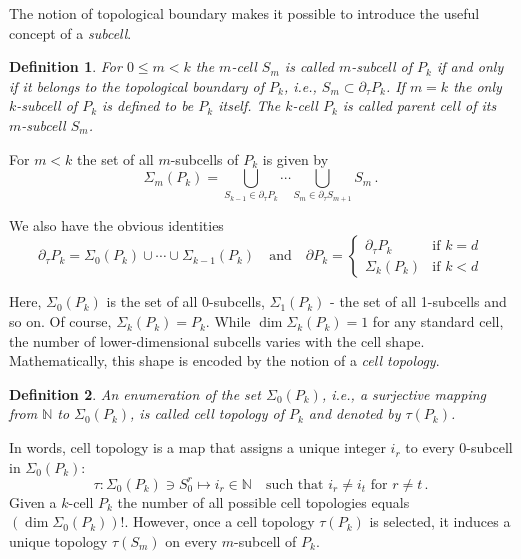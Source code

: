 \documentclass[pdf,12pt,relaxed]{SANDreport}
\newtheorem{defin}{Definition}
\begin{document}
    The notion of topological boundary makes it possible to introduce the useful concept of a \emph{subcell}.
         
    \begin{defin}\label{def:subcell}
    For $0 \le m < k$ the $m$-cell $S_m$ is called $m$-subcell of $P_k$ if and only if it belongs to the topological boundary of $P_k$, i.e., $S_m\subset\partial_\tau{P_k}$. If $m=k$ the only $k$-subcell of $P_k$ is defined to be $P_k$ itself. The $k$-cell $P_k$ is called parent cell of its $m$-subcell $S_m$. 
    \end{defin}
    
    For $m<k$ the set of all $m$-subcells of $P_k$ is given by
    \begin{equation}\label{eq:m-subs}
    \Sigma_m(P_k) = \bigcup_{S_{k-1}\in\partial_\tau P_k} \cdots \bigcup_{S_{m}\in\partial_\tau S_{m+1}} S_m \,.
    \end{equation}
    
    We also have the obvious identities
    $$
    \partial_\tau P_k = \Sigma_{0}(P_k)\cup \cdots \cup \Sigma_{k-1}(P_k)
    \quad\mbox{and}\quad
    \partial P_k =
    \left\{ 
    \begin{array}{rl} 
    \displaystyle \partial_\tau P_k & \mbox{if $k=d$} \\[1ex]
    \displaystyle \Sigma_k(P_k)    & \mbox{if $k<d$}
    \end{array}
    \right.
    $$
    
    Here, $\Sigma_0(P_k)$ is the set of all $0$-subcells, $\Sigma_1(P_k)$ - the set of all 1-subcells and so on. Of course, $\Sigma_k(P_k) = P_k$. While $\dim \Sigma_k(P_k) = 1$ for any standard cell, the number of lower-dimensional subcells varies with the cell shape. Mathematically, this shape is encoded by the notion of a \emph{cell topology}.
    

    \begin{defin}\label{def:cell-topo}
    An enumeration of the set $\Sigma_0(P_k)$, i.e., a surjective mapping from $\mathbb{N}$ to $\Sigma_0(P_k)$, is called cell topology of $P_k$ and denoted by $\tau(P_k)$. 
    \end{defin}
    
    In words, cell topology is a map that assigns a unique integer $i_r$ to every $0$-subcell in $\Sigma_0(P_k)$:
    $$
    \tau: \Sigma_0(P_k)\ni S_0^{r} \mapsto i_r\in \mathbb{N}\quad \mbox{such that $i_r\neq i_t$ for $r\neq t$} \,.
    $$
    Given a $k$-cell $P_k$ the number of all possible cell topologies equals $(\dim \Sigma_0(P_k))!$. However, once a cell topology $\tau(P_k)$ is selected, it induces a unique topology $\tau(S_m)$ on every $m$-subcell of $P_k$. 
    
\end{document}
